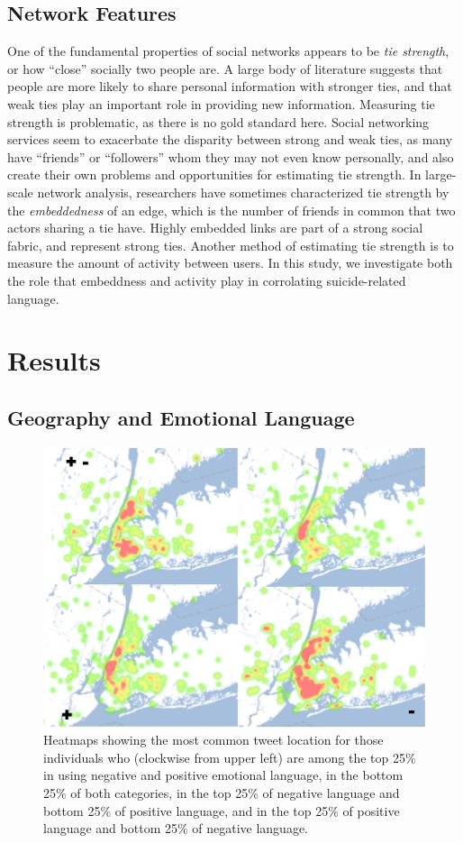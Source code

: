 \documentclass[11pt]{article}
\begin{document}
\subsection{Network Features}
One of the fundamental properties of social networks appears to be \emph{tie strength}, or how ``close'' socially two people are. A large body of literature suggests that people are more likely to share personal information with stronger ties, and that weak ties play an important role in providing new information.  
Measuring tie strength is problematic, as there is no gold standard here. Social networking services seem to exacerbate the disparity between strong and weak ties, as many have ``friends'' or ``followers'' whom they may not even know personally, and also create their own problems and opportunities for estimating tie strength. In large-scale network analysis, researchers have sometimes characterized tie strength by the 
\emph{embeddedness} of an edge, which is the number of friends in common that two actors sharing a tie have. Highly embedded links are part of a strong social fabric, and represent strong ties. Another method of estimating tie strength is to measure the amount of activity between users. In this study, we investigate both the role that embeddness and activity play in corrolating suicide-related language. 

\section{Results}
\subsection{Geography and Emotional Language}
\begin{figure}
  \centering
  \includegraphics[scale=.4]{nyc-emo.pdf}
  \caption{Heatmaps showing the most common tweet location for those individuals who (clockwise from upper left) are among the top 25\% in using negative and positive emotional language, in the bottom 25\%  of both categories, in the top 25\% of negative language and bottom 25\% of positive language, and in the top 25\% of positive language and bottom 25\% of negative language.}
  \label{fig:geo}
\end{figure}
\end{document}
